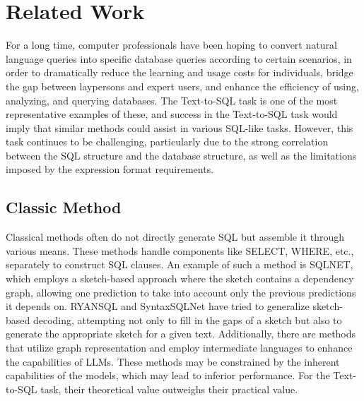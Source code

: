 \section{Related Work}
For a long time, computer professionals have been hoping to convert natural language queries into specific database queries according to certain scenarios, in order to dramatically reduce the learning and usage costs for individuals, bridge the gap between laypersons and expert users, and enhance the efficiency of using, analyzing, and querying databases. The Text-to-SQL task is one of the most representative examples of these, and success in the Text-to-SQL task would imply that similar methods could assist in various SQL-like tasks. However, this task continues to be challenging, particularly due to the strong correlation between the SQL structure and the database structure, as well as the limitations imposed by the expression format requirements\cite{katsogiannis2023survey}.

\subsection{Classic Method}
Classical methods often do not directly generate SQL but assemble it through various means. These methods handle components like SELECT, WHERE, etc., separately to construct SQL clauses. An example of such a method is SQLNET\cite{sqlnet}, which employs a sketch-based approach where the sketch contains a dependency graph, allowing one prediction to take into account only the previous predictions it depends on. RYANSQL\cite{ryansql} and SyntaxSQLNet\cite{syntaxsqlnet} have tried to generalize sketch-based decoding, attempting not only to fill in the gaps of a sketch but also to generate the appropriate sketch for a given text. Additionally, there are methods that utilize graph representation\cite{graph_1,graph2} and employ intermediate languages\cite{irnet,smbop} to enhance the capabilities of LLMs. These methods may be constrained by the inherent capabilities of the models, which may lead to inferior performance. For the Text-to-SQL task, their theoretical value outweighs their practical value.

